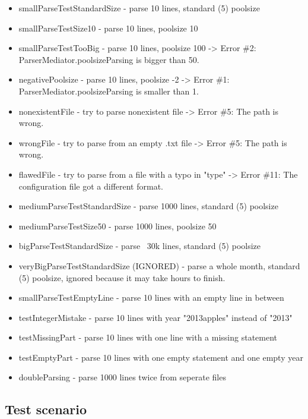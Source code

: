 \begin{itemize}

\item smallParseTestStandardSize - parse 10 lines, standard (5) poolsize
\item smallParseTestSize10 - parse 10 lines, poolsize 10
\item smallParseTestTooBig - parse 10 lines, poolsize 100 -> Error \#2: ParserMediator.poolsizeParsing is bigger than 50.
\item negativePoolsize - parse 10 lines, poolsize -2 -> Error \#1: ParserMediator.poolsizeParsing is smaller than 1.
\item nonexistentFile - try to parse nonexistent file -> Error \#5: The path is wrong.
\item wrongFile - try to parse from an empty .txt file -> Error \#5: The path is wrong.
\item flawedFile - try to parse from a file with a typo in "type" -> Error \#11: The configuration file got a different format.
\item mediumParseTestStandardSize - parse 1000 lines, standard (5) poolsize
\item mediumParseTestSize50 - parse 1000 lines, poolsize 50
\item bigParseTestStandardSize - parse ~30k lines, standard (5) poolsize
\item veryBigParseTestStandardSize (IGNORED) - parse a whole month, standard (5) poolsize, ignored because it may take hours 
to finish.
\item smallParseTestEmptyLine - parse 10 lines with an empty line in between
\item testIntegerMistake - parse 10 lines with year "2013apples" instead of "2013"
\item testMissingPart - parse 10 lines with one line with a missing statement
\item testEmptyPart - parse 10 lines with one empty statement and one empty year
\item doubleParsing - parse 1000 lines twice from seperate files

\end{itemize}

\subsection{Test scenario}
